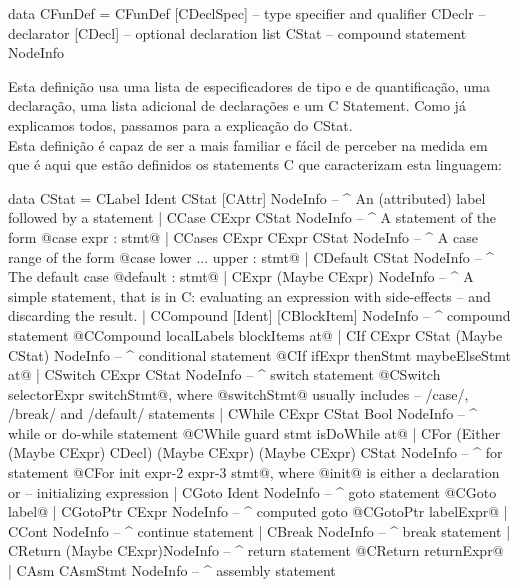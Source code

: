 \begin{haskell}
data CFunDef = CFunDef [CDeclSpec]      -- type specifier and qualifier
               CDeclr           -- declarator
               [CDecl]          -- optional declaration list
               CStat            -- compound statement
               NodeInfo
\end{haskell}

Esta definição usa uma lista de especificadores de tipo e de quantificação, uma declaração,
uma lista adicional de declarações e um C Statement. Como já explicamos todos, passamos para a explicação
do \textrm{CStat}.\\

Esta definição é capaz de ser a mais familiar e fácil de perceber na medida em que é aqui que estão
definidos os statements C que caracterizam esta linguagem:

\begin{haskell}
data CStat = CLabel  Ident CStat [CAttr] NodeInfo  -- ^ An (attributed) label followed by a statement
           | CCase CExpr CStat NodeInfo            -- ^ A statement of the form @case expr : stmt@
           | CCases CExpr CExpr CStat NodeInfo     -- ^ A case range of the form @case lower ... upper : stmt@
           | CDefault CStat NodeInfo               -- ^ The default case @default : stmt@
           | CExpr (Maybe CExpr) NodeInfo
             -- ^ A simple statement, that is in C: evaluating an expression with side-effects
             --   and discarding the result.
           | CCompound [Ident] [CBlockItem] NodeInfo    -- ^ compound statement @CCompound localLabels blockItems at@
           | CIf CExpr CStat (Maybe CStat) NodeInfo     -- ^ conditional statement @CIf ifExpr thenStmt maybeElseStmt at@
           | CSwitch CExpr CStat NodeInfo
             -- ^ switch statement @CSwitch selectorExpr switchStmt@, where @switchStmt@ usually includes
             -- /case/, /break/ and /default/ statements
           | CWhile CExpr CStat Bool NodeInfo      -- ^ while or do-while statement @CWhile guard stmt isDoWhile at@
           | CFor (Either (Maybe CExpr) CDecl)
             (Maybe CExpr)
             (Maybe CExpr)
             CStat
             NodeInfo
             -- ^ for statement @CFor init expr-2 expr-3 stmt@, where @init@ is either a declaration or
             -- initializing expression
           | CGoto Ident NodeInfo            -- ^ goto statement @CGoto label@
           | CGotoPtr CExpr NodeInfo         -- ^ computed goto @CGotoPtr labelExpr@
           | CCont NodeInfo                  -- ^ continue statement
           | CBreak    NodeInfo              -- ^ break statement
           | CReturn (Maybe CExpr)NodeInfo   -- ^ return statement @CReturn returnExpr@
           | CAsm CAsmStmt NodeInfo          -- ^ assembly statement
\end{haskell}


